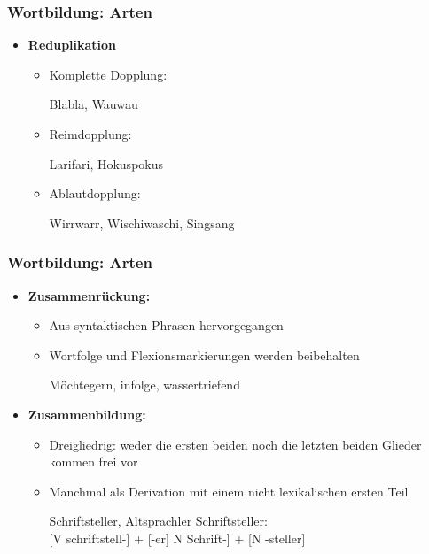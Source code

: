 \begin{frame}
\frametitle{Wortbildung: Arten}

\begin{itemize}
\item \textbf{Reduplikation}

\begin{itemize}
\item Komplette Dopplung:

\ea Blabla, Wauwau
\z

\item Reimdopplung:

\ea Larifari, Hokuspokus
\z

\item Ablautdopplung:

\ea Wirrwarr, Wischiwaschi, Singsang
\z

\end{itemize}

\end{itemize}

\end{frame}


\begin{frame}
\frametitle{Wortbildung: Arten}

\begin{itemize}
\item \textbf{Zusammenrückung:}

\begin{itemize}
\item Aus syntaktischen Phrasen hervorgegangen
\item Wortfolge und Flexionsmarkierungen werden beibehalten

\ea Möchtegern, infolge, wassertriefend
\z

\end{itemize}

\item \textbf{Zusammenbildung:}

\begin{itemize}
\item Dreigliedrig: weder die ersten beiden noch die letzten beiden Glieder kommen frei vor
\item Manchmal als Derivation mit einem nicht lexikalischen ersten Teil

\eal 
\ex Schriftsteller, Altsprachler
\ex Schriftsteller: \\ {[}V schriftstell-{]} + {[}-er{]} \vs {[}N Schrift-{]} + {[}N -steller{]}
\zl

\end{itemize}
\end{itemize}


\end{frame}


